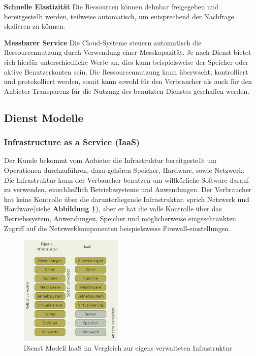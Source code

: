 \textbf{Schnelle Elastizität}
Die Ressourcen können dehnbar freigegeben und bereitgestellt werden, teilweise automatisch, um entsprechend der Nachfrage skalieren zu können\cite{nist_definition}.

\textbf{Messbarer Service}
Die Cloud-Systeme steuern automatisch die Ressourcennutzung durch Verwendung einer Messkapazität. Je nach Dienst bietet sich hierfür unterschiedliche Werte an, dies kann beispielsweise der Speicher oder aktive Benutzerkonten sein. Die Ressourcennutzung kann überwacht, kontrolliert und protokolliert werden, somit kann sowohl für den Verbraucher als auch für den Anbieter Transparenz für die Nutzung des benutzten Dienstes geschaffen werden\cite{nist_definition}.


\subsection{Dienst Modelle}
\subsubsection{Infrastructure as a Service (IaaS)} 
Der Kunde bekommt vom Anbieter die Infrastruktur bereitgestellt um Operationen durchzuführen, dazu gehören Speicher, Hardware, sowie Netzwerk. Die Infrastruktur kann der Verbaucher benutzen um willkürliche Software darauf zu verwenden, einschließlich Betriebssysteme und Anwendungen. Der Verbraucher hat keine Kontrolle über die darunterliegende Infrastruktur, sprich Netzwerk und Hardware(siehe \textbf{Abbildung \ref{fig:iaas}}), aber er hat die volle Kontrolle über das Betriebssystem, Anwendungen, Speicher und möglicherweise eingeschränkten Zugriff auf die Netzwerkkomponenten beispielsweise Firewall-einstellungen\cite{nist_definition}.

\begin{figure}[H]
	\centering
	\includegraphics[width=0.45\textwidth]{Images/Iaas}
	\caption{Dienst Modell IaaS im Vergleich zur eigens verwalteten Infrastruktur}
	\label{fig:iaas}
\end{figure}

